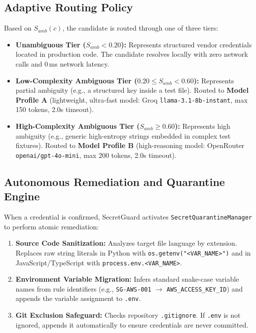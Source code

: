 \subsection{Adaptive Routing Policy}
Based on $S_{amb}(c)$, the candidate is routed through one of three tiers:
\begin{itemize}
    \item \textbf{Unambiguous Tier ($S_{amb} < 0.20$):} Represents structured vendor credentials located in production code. The candidate resolves locally with zero network calls and 0\,ms network latency.
    \item \textbf{Low-Complexity Ambiguous Tier ($0.20 \le S_{amb} < 0.60$):} Represents partial ambiguity (e.g., a structured key inside a test file). Routed to \textbf{Model Profile A} (lightweight, ultra-fast model: Groq \texttt{llama-3.1-8b-instant}, max 150 tokens, 2.0s timeout).
    \item \textbf{High-Complexity Ambiguous Tier ($S_{amb} \ge 0.60$):} Represents high ambiguity (e.g., generic high-entropy strings embedded in complex test fixtures). Routed to \textbf{Model Profile B} (high-reasoning model: OpenRouter \texttt{openai/gpt-4o-mini}, max 200 tokens, 2.0s timeout).
\end{itemize}

\subsection{Autonomous Remediation and Quarantine Engine}
When a credential is confirmed, SecretGuard activates \texttt{SecretQuarantineManager} to perform atomic remediation:
\begin{enumerate}
    \item \textbf{Source Code Sanitization:} Analyzes target file language by extension. Replaces raw string literals in Python with \texttt{os.getenv("<VAR\_NAME>")} and in JavaScript/TypeScript with \texttt{process.env.<VAR\_NAME>}.
    \item \textbf{Environment Variable Migration:} Infers standard snake-case variable names from rule identifiers (e.g., \texttt{SG-AWS-001} $\to$ \texttt{AWS\_ACCESS\_KEY\_ID}) and appends the variable assignment to \texttt{.env}.
    \item \textbf{Git Exclusion Safeguard:} Checks repository \texttt{.gitignore}. If \texttt{.env} is not ignored, appends it automatically to ensure credentials are never committed.
\end{enumerate}
